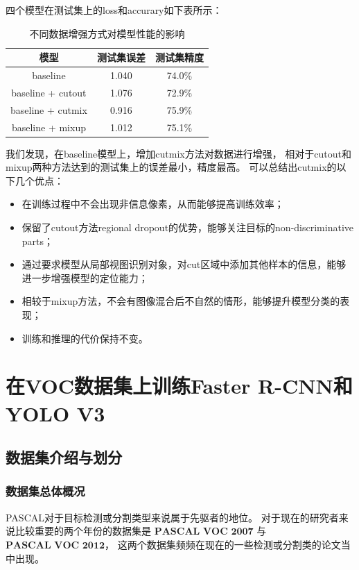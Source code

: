 \documentclass[UTF8]{ctexart}
\begin{document}
四个模型在测试集上的loss和accurary如下表所示：

\begin{table}[!ht]
    \begin{center}
        \begin{tabular}{ccc}
            \hline
            模型  & 测试集误差 & 测试集精度 \\ \hline
            baseline & 1.040 & 74.0\% \\ \hline
            baseline + cutout & 1.076 & 72.9\% \\ \hline
            baseline + cutmix & 0.916 & 75.9\% \\ \hline
            baseline + mixup & 1.012 & 75.1\% \\ \hline
            \end{tabular}
        \caption{不同数据增强方式对模型性能的影响}
    \end{center}
\end{table}

我们发现，在baseline模型上，增加cutmix方法对数据进行增强，
相对于cutout和mixup两种方法达到的测试集上的误差最小，精度最高。
可以总结出cutmix的以下几个优点：
\begin{itemize}
    \item 在训练过程中不会出现非信息像素，从而能够提高训练效率；
    \item 保留了cutout方法regional dropout的优势，能够关注目标的non-discriminative parts；
    \item 通过要求模型从局部视图识别对象，对cut区域中添加其他样本的信息，能够进一步增强模型的定位能力；
    \item 相较于mixup方法，不会有图像混合后不自然的情形，能够提升模型分类的表现；
    \item 训练和推理的代价保持不变。
\end{itemize}

\newpage
\section{在VOC数据集上训练Faster R-CNN和YOLO V3}
\subsection{数据集介绍与划分}

\subsubsection{数据集总体概况}
PASCAL对于目标检测或分割类型来说属于先驱者的地位。
对于现在的研究者来说比较重要的两个年份的数据集是 $\textbf{PASCAL VOC 2007}$ 
与 $\textbf{PASCAL VOC 2012}$，
这两个数据集频频在现在的一些检测或分割类的论文当中出现。
\end{document}
